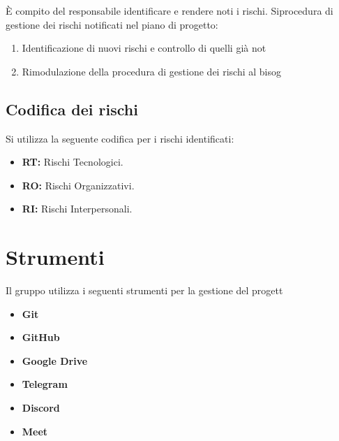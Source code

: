 È compito del responsabile identificare e rendere noti i rischi. Si\eguente procedura di gestione dei rischi notificati nel piano di progetto:

\begin{enumerate}
\item Identificazione di nuovi rischi e controllo di quelli già not\
\item Rimodulazione della procedura di gestione dei rischi al bisog\
\end{enumerate}

\subsection{Codifica dei rischi}

Si utilizza la seguente codifica per i rischi identificati:

\begin{itemize}
\item \textbf{RT:} Rischi Tecnologici.
\item \textbf{RO:} Rischi Organizzativi.
\item \textbf{RI:} Rischi Interpersonali.
\end{itemize}

\section{Strumenti}

Il gruppo utilizza i seguenti strumenti per la gestione del progett\

\begin{itemize}
\item \textbf{Git}
\item \textbf{GitHub}
\item \textbf{Google Drive}
\item \textbf{Telegram}
\item \textbf{Discord}
\item \textbf{Meet}
\end{itemize}